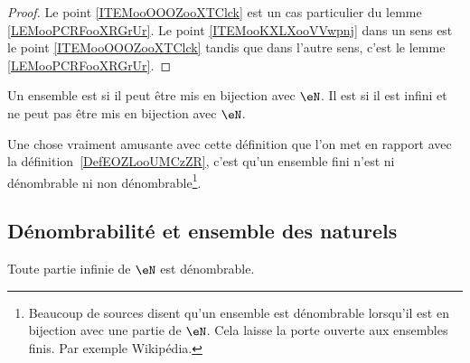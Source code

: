 \begin{proof}
	Le point \ref{ITEMooOOOZooXTClck} est un cas particulier du lemme \ref{LEMooPCRFooXRGrUr}. Le point \ref{ITEMooKXLXooVVwpnj} dans un sens est le point \ref{ITEMooOOOZooXTClck} tandis que dans l'autre sens, c'est le lemme \ref{LEMooPCRFooXRGrUr}.
\end{proof}


\begin{definition}\label{DefEnsembleDenombrable}
	Un ensemble est  si il peut être mis en bijection avec \( \eN\). Il est  si il est infini et ne peut pas être mis en bijection avec \( \eN\).
\end{definition}
Une chose vraiment amusante avec cette définition que l'on met en rapport avec la définition~\ref{DefEOZLooUMCzZR}, c'est qu'un ensemble fini n'est ni dénombrable ni non dénombrable\footnote{Beaucoup de sources disent qu'un ensemble est dénombrable lorsqu'il est en bijection avec une partie de \( \eN\). Cela laisse la porte ouverte aux ensembles finis. Par exemple Wikipédia\cite{ooLMVKooUiQUtb}.}.



\subsection{Dénombrabilité et ensemble des naturels}

\begin{proposition}      \label{PROPooOBKMooWEGCvM}
	Toute partie infinie de \( \eN\) est dénombrable.
\end{proposition}

